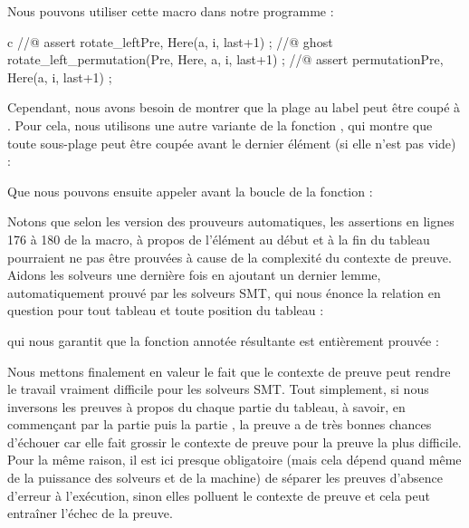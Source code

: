 Nous pouvons utiliser cette macro dans notre programme :


\begin{CodeBlock}{c}
//@ assert rotate_left{Pre, Here}(a, i, last+1) ;
//@ ghost rotate_left_permutation(Pre, Here, a, i, last+1) ;
//@ assert permutation{Pre, Here}(a, i, last+1) ;
\end{CodeBlock}


Cependant, nous avons besoin de montrer que la plage au label  peut
être coupé à  . Pour cela, nous utilisons une autre variante de la
fonction , qui montre que toute sous-plage peut être coupée avant
le dernier élément (si elle n'est pas vide) :




Que nous pouvons ensuite appeler avant la boucle de la fonction  :




Notons que selon les version des prouveurs automatiques, les assertions en lignes
176 à 180 de la macro, à propos de l'élément au début et à la fin du tableau
pourraient ne pas être prouvées à cause de la complexité du contexte de preuve.
Aidons les solveurs une dernière fois en ajoutant un dernier lemme, automatiquement
prouvé par les solveurs SMT, qui nous énonce la relation en question pour tout
tableau et toute position du tableau :




qui nous garantit que la fonction annotée résultante est entièrement prouvée :




Nous mettons finalement en valeur le fait que le contexte de preuve peut rendre
le travail vraiment difficile pour les solveurs SMT. Tout simplement, si nous 
inversons les preuves à propos du chaque partie du tableau, à savoir, en
commençant par la partie  puis la partie ,
la preuve a de très bonnes chances d'échouer car elle fait grossir le contexte de
preuve pour la preuve la plus difficile. Pour la même raison, il est ici presque
obligatoire (mais cela dépend quand même de la puissance des solveurs et de la
machine) de séparer les preuves d'absence d'erreur à l'exécution, sinon elles
polluent le contexte de preuve et cela peut entraîner l'échec de la preuve.


